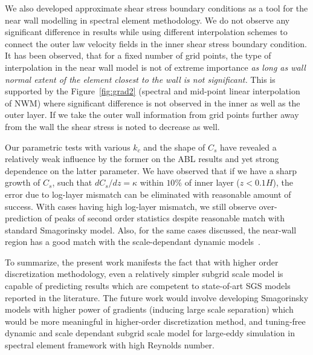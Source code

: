 We also developed approximate shear stress boundary conditions as a tool for the near wall modelling in spectral element methodology. We do not observe any significant difference in results while using different interpolation schemes to connect the outer law velocity fields in the inner shear stress boundary condition. It has been observed, that for a fixed number of grid points, the type of interpolation in the near wall model is not of extreme importance \textit{as long as wall normal extent of the element closest to the wall is not significant.} This is supported by the Figure~\ref{fig:grad2} (spectral and mid-point linear interpolation of NWM) w{h}ere significant difference is not observed in the inner as well as the outer layer. {If we take the outer wall information from grid points further away from the wall the shear stress is noted to decrease as well.~\cite{sag}} 

 Our parametric tests with various $k_c$ and the shape of $C_s$ have revealed a relatively weak influence by the former on the ABL results and yet strong dependence on the latter parameter. We have observed that if we have a sharp growth of $C_s$, such that $dC_s/dz = \kappa$ within $10\%$ of inner layer ($z < 0.1H$), the error due to log-layer mismatch can be eliminated with reasonable amount of success. With cases having high log-layer mismatch, we still observe  over-prediction of peaks of second order statistics despite reasonable match with standard Smagorinsky model.  Also, for the same cases discussed, the near-wall region has a good match with the scale-dependant dynamic models~\cite{porte1fun}. 
 
To summarize, the present work manifests the fact that with higher order discretization methodology, even a relatively simpler subgrid scale model is capable of predicting results which are competent to state-of-art SGS models reported in the literature. The future work would involve developing Smagorinsky models with higher power of gradients (inducing large scale sep{a}ration) which would be more meaningful in higher-order discretization method, and tuning{-}free dynamic and scale dependant subgrid scale model for large-eddy simulation in spectral element framework with high Reynolds number. 